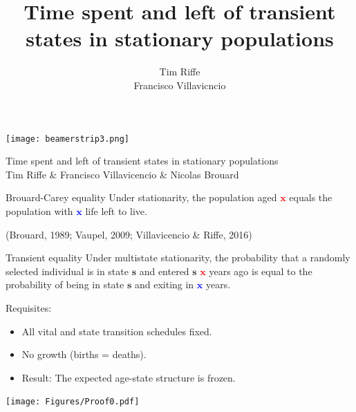 \documentclass[20pt,usenames,dvipsnames]{beamer}
\title{Time spent and left of transient states in
stationary populations}
\subtitle{Tim Riffe \\ Francisco Villavicncio}		%
\begin{document}

\begin{frame}[plain]
	\vspace{-3cm}
 \centerline{\texttt{[image: beamerstrip3.png]}}

	
	\huge
	\vspace{1em}
	
	Time spent and left of transient states in stationary populations\\
	\vspace{1em}
	\large 
	Tim Riffe \& Francisco Villavicencio \& Nicolas Brouard
\end{frame}


\begin{frame}[plain]
\Large
 \begin{block}{Brouard-Carey equality}
  Under stationarity, the population aged \textcolor{red}{$\mathbf{x}$} equals the population with \textcolor{blue}{$\mathbf{x}$} life left to live.\\ 
 \end{block}
\small{(Brouard, 1989; Vaupel, 2009; Villavicencio \& Riffe, 2016)}
\pause
\vspace{2em}
\Large
 \begin{block}{Transient equality}
  Under multistate stationarity, the probability that a randomly selected individual is in
  state \textcolor{OliveGreen}{$\mathbf{s}$} and entered
  \textcolor{OliveGreen}{$\mathbf{s}$} \textcolor{red}{$\mathbf{x}$} years ago
  is equal to the probability of being in state
  \textcolor{OliveGreen}{$\mathbf{s}$} and exiting in
  \textcolor{blue}{$\mathbf{x}$} years.
 \end{block}
\end{frame}

\begin{frame}[plain]
\Large
\centering
Requisites:
\begin{itemize}[<+->]
\item All vital and state transition schedules fixed.
\item No growth (births = deaths).
\item Result: The expected age-state structure is frozen.
\end{itemize}
\end{frame}


\begin{frame}[plain]
\Large
\begin{center}
\texttt{[image: Figures/Proof0.pdf]}
\end{center}
\end{frame}
\end{document}

